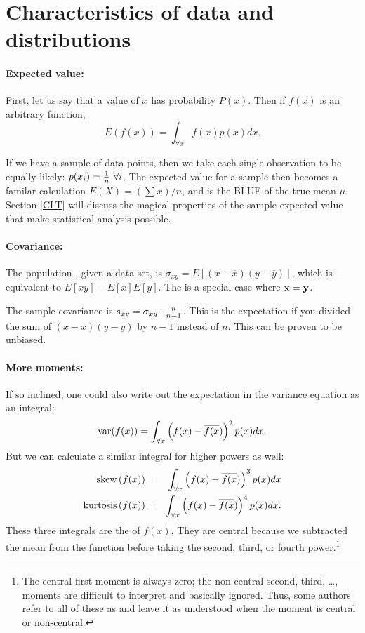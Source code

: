 \section{Characteristics of data and distributions}\label{basicstats}

\paragraph{Expected value:} 
First, let us say that a value of $x$ has probability $P(x)$. Then
if $f(x)$ is an arbitrary function, 
$$E\left(f(x)\right)=\int_{\forall x} f(x)p(x) dx.$$

If we have a sample of data points, then we take each single observation
to be equally likely: $p(x_i)={1\over n}\ \forall i$.
The expected value for a sample then becomes a familar calculation
$E(X)=(\sum x)/n$, and is the BLUE of
the true mean $\mu$. Section \ref{CLT} will discuss the magical properties of the
sample expected value that make statistical analysis possible.

\paragraph{Covariance:} The population , given a data set,
is $\sigma_{xy} = E[(x-\overline x)(y-\overline y)]$, which is equivalent
to $E[xy]-E[x]E[y]$. The  is a special case where ${\bf x}={\bf y}$.

The sample covariance is $s_{xy}=\sigma_{xy}\cdot {n\over n-1}$. This
is
the expectation if you  divided the sum of $(x-\overline
x)(y-\overline y)$ by $n-1$ instead of $n$. This
can be proven to be unbiased.

\paragraph{More moments:}   
If so inclined, one could also write out the
expectation in the variance equation as an integral:
$$\operatorname{var}(f(x))=\int_{\forall x} \left(f(x) - \overline{f(x})\right)^2 p(x) dx.$$
But we can calculate a similar integral for higher powers as well:
\begin{eqnarray*}
{\rm skew}\left(f(x)\right)&=&\int_{\forall x} \left(f(x) - \overline{f(x})\right)^3 p(x) dx\\
{\rm kurtosis}\left(f(x)\right)&=&\int_{\forall x} \left(f(x) - \overline{f(x})\right)^4 p(x) dx.
\end{eqnarray*}
These three integrals are the  of $f(x)$. They
are central because we subtracted the mean from the function before
taking the second, third, or fourth power.\footnote{The
central first moment is always zero; the non-central second, third,
\dots, moments are difficult to interpret and basically ignored. Thus,
some authors refer to all of these as  and leave
it as understood when the moment is central or non-central.}

